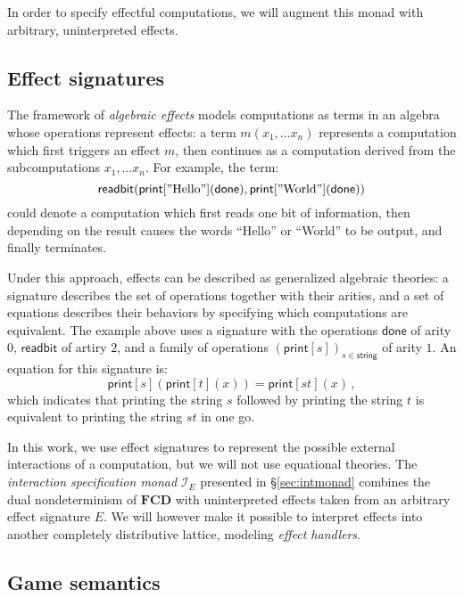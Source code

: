 \documentclass[format=sigplan,authordraft]{acmart}
\newcommand{\kw}[1]{\ensuremath{ \mathsf{#1} }}
\begin{document}
In order to specify effectful computations,
we will augment this monad with
arbitrary, uninterpreted effects.



\subsection{Effect signatures} \label{sec:bg:sig} %

The framework of \emph{algebraic effects}
models computations as terms in an algebra
whose operations represent effects:
a term $m(x_1, \ldots x_n)$
represents a computation which first
triggers an effect $m$,
then continues as a computation derived from
the subcomputations $x_1, \ldots x_n$.
For example,
the term:
\[
    \kw{readbit}(
      \kw{print}["\text{Hello}"](\kw{done}),
      \kw{print}["\text{World}"](\kw{done}))
\]
could denote a computation which
first reads one bit of information,
then depending on the result
causes the words ``Hello'' or ``World'' to be output,
and finally terminates.

Under this approach,
effects can be described as generalized algebraic theories:
a signature describes the set of operations together with their arities,
and a set of equations describes their behaviors
by specifying which computations are equivalent.
The example above uses a signature with the operations
$\kw{done}$ of arity $0$,
$\kw{readbit}$ of artiry $2$,
and a family of operations $(\kw{print}[s])_{s \in \kw{string}}$
of arity $1$.
An equation for this signature is:
\[
    \kw{print}[s](\kw{print}[t](x)) =
    \kw{print}[st](x) \,,
\]
which indicates that
printing the string $s$ followed by
printing the string $t$ is equivalent to
printing the string $st$ in one go.

In this work,
we use effect signatures to represent
the possible external interactions
of a computation,
but we will not use equational theories.
The \emph{interaction specification monad} $\mathcal{I}_E$
presented in \S\ref{sec:intmonad}
combines the dual nondeterminism of $\mathbf{FCD}$ with
uninterpreted effects taken from
an arbitrary effect signature $E$.
We will however make it possible to interpret effects
into another completely distributive lattice,
modeling \emph{effect handlers}.


\subsection{Game semantics} \label{sec:strat} %
\end{document}

